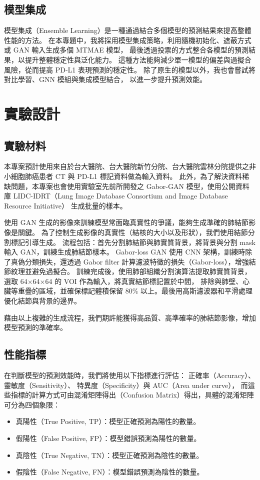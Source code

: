 \documentclass[12pt,a4paper]{article}
\begin{document}
\subsection{模型集成}
模型集成（Ensemble Learning）是一種通過結合多個模型的預測結果來提高整體性能的方法。
在本專題中，我將採用模型集成策略，利用隨機初始化、遮蔽方式或 GAN 輸入生成多個 MTMAE 模型，
最後透過投票的方式整合各模型的預測結果，以提升整體穩定性與泛化能力。
這種方法能夠減少單一模型的偏差與過擬合風險，從而提高 PD-L1 表現預測的穩定性。
除了原生的模型以外，我也會嘗試將對比學習、GNN 模組與集成模型結合，
以進一步提升預測效能。
\newpage

\section{實驗設計}

\subsection{實驗材料}

本專案預計使用來自於台大醫院、台大醫院新竹分院、台大醫院雲林分院提供之非小細胞肺癌患者 CT 與 PD-L1 標記資料做為輸入資料。
此外，為了解決資料稀缺問題，本專案也會使用實驗室先前所開發之 Gabor-GAN 模型，使用公開資料庫
LIDC-IDRT（Lung Image Database Consortium and Image Database Resource Initiative） 生成批量的樣本。

使用 GAN 生成的影像來訓練模型常面臨真實性的爭議，能夠生成準確的肺結節影像是關鍵。
為了控制生成影像的真實性（結核的大小以及形狀），我們使用結節分割標記引導生成。
流程包括：首先分割肺結節與肺實質背景，將背景與分割 mask 輸入 GAN，訓練生成肺結節樣本。
Gabor-loss GAN 使用 CNN 架構，訓練時除了真偽分類損失，還透過 Gabor filter 計算濾波特徵的損失（Gabor-loss），增強結節紋理並避免過擬合。
訓練完成後，使用肺部組織分割演算法提取肺實質背景，選取 64$\times$64$\times$64 的 VOI 作為輸入，將真實結節標記置於中間，
排除與肺壁、心臟等重疊的區域，並確保標記體積保留 80\% 以上。最後用高斯濾波器和平滑處理優化結節與背景的邊界。

藉由以上複雜的生成流程，我們期許能獲得高品質、高準確率的肺結節影像，增加模型預測的準確率。

\subsection{性能指標}

在判斷模型的預測效能時，我們將使用以下指標進行評估：
正確率（Accuracy）、靈敏度（Sensitivity）、  特異度（Specificity）與 AUC（Area under curve），
而這些指標的計算方式可由混淆矩陣得出（Confusion Matrix）得出，具體的混淆矩陣可分為四個象限：
\begin{itemize}
    \item 真陽性（True Positive, TP）：模型正確預測為陽性的數量。
    \item 假陽性（False Positive, FP）：模型錯誤預測為陽性的數量。
    \item 真陰性（True Negative, TN）：模型正確預測為陰性的數量。
    \item 假陰性（False Negative, FN）：模型錯誤預測為陰性的數量。
\end{itemize}
\end{document}
